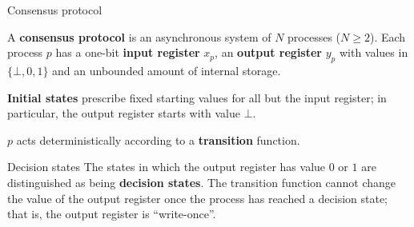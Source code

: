 \documentclass[12pt]{beamer}
\begin{document}
  \begin{frame}{Consensus protocol}
    \begin{definition}
      A \textbf{consensus protocol} is an asynchronous system of \(N\) processes (\(N\ge 2\)). Each process \(p\) has a one-bit \textbf{input register} \(x_p\), an \textbf{output register} \(y_p\) with values in \(\{\bot, 0, 1\}\) and an unbounded amount of internal storage.
    \end{definition}

    \vspace{0.25cm}

    \textbf{Initial states} prescribe fixed starting values for all but the input register; in particular, the output register starts with value \(\bot\).

    \vspace{0.25cm}

    \(p\) acts deterministically according to a \textbf{transition} function.
  \end{frame}

  \begin{frame}{Decision states}
    The states in which the output register has value \(0\) or \(1\) are distinguished as being \textbf{decision states}. The transition function cannot change the value of the output register once the process has reached a decision state; that is, the output register is ``write-once''.

    \vspace{0.25cm}

    \begin{figure}
    \end{figure}
  \end{frame}
\end{document}

